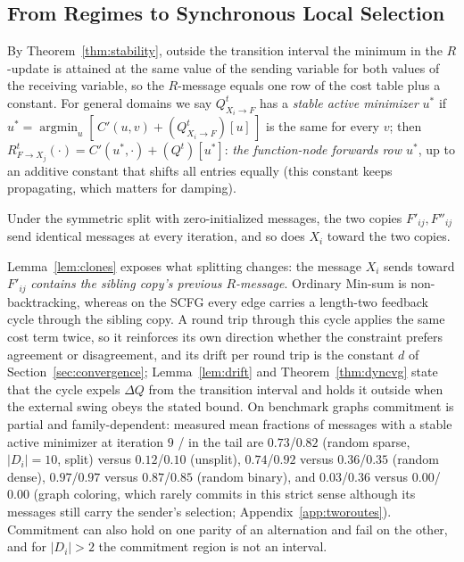 \subsection{From Regimes to Synchronous Local Selection}\label{sec:rule}

By Theorem~\ref{thm:stability}, outside the transition interval the
minimum in the $R$-update is attained at the same value of the sending
variable for both values of the receiving variable, so the $R$-message
equals one row of the cost table plus a constant.  For general domains we
say $Q^{t}_{X_i \to F}$ has a \emph{stable active minimizer} $u^{*}$ if
$u^{*} = \operatorname{argmin}_{u}[\,C'(u,v) + (Q^{t}_{X_i\to F})[u]\,]$
is the same for every $v$; then $R^{t}_{F\to X_j}(\cdot) =
C'(u^{*},\cdot) + (Q^{t})[u^{*}]$: \emph{the function-node forwards row
$u^{*}$}, up to an additive constant that shifts all entries equally
(this constant keeps propagating, which matters for damping).

\begin{lemma}\label{lem:clones}
Under the symmetric split with zero-initialized messages, the two copies
$F'_{ij}, F''_{ij}$ send identical messages at every iteration, and so
does $X_i$ toward the two copies.
\end{lemma}

Lemma~\ref{lem:clones} exposes what splitting changes: the message $X_i$
sends toward $F'_{ij}$ \emph{contains the sibling copy's previous
$R$-message}.  Ordinary Min-sum is non-backtracking, whereas on the SCFG
every edge carries a length-two feedback cycle through the sibling copy.
A round trip through this cycle applies the same cost term twice, so it
reinforces its own direction whether the constraint prefers agreement or
disagreement, and its drift per round trip is the constant $d$ of
Section~\ref{sec:convergence}; Lemma~\ref{lem:drift} and
Theorem~\ref{thm:dyncvg} state that the cycle expels $\Delta Q$ from the
transition interval and holds it outside when the external swing obeys
the stated bound.  On benchmark graphs commitment is partial and
family-dependent: measured mean fractions of messages with a stable
active minimizer at iteration $9$ / in the tail are $0.73$/$0.82$
(random sparse, $|D_i|{=}10$, split) versus $0.12$/$0.10$ (unsplit),
$0.74$/$0.92$ versus $0.36$/$0.35$ (random dense), $0.97$/$0.97$ versus
$0.87$/$0.85$ (random binary), and $0.03$/$0.36$ versus $0.00$/$0.00$
(graph coloring, which rarely commits in this strict sense although its
messages still carry the sender's selection; Appendix~\ref{app:tworoutes}).
Commitment can also hold on one parity of an alternation and fail on the
other, and for $|D_i| > 2$ the commitment region is not an interval.


